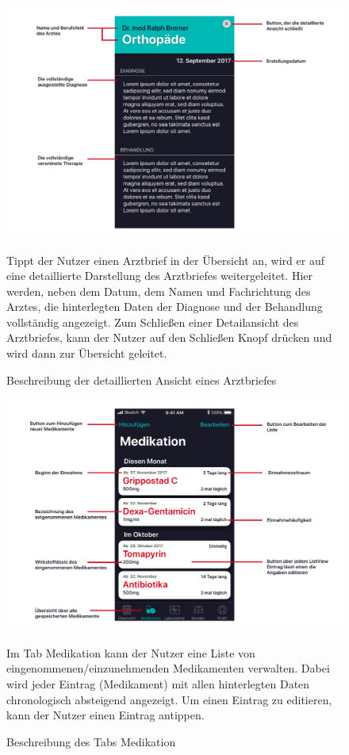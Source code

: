 \documentclass[a4paper]{scrreprt}
\begin{document}
\begin{figure}
\includegraphics[width=1\textwidth]{graphics/UIDescriptions/DetailedDLDesc}
\caption{Beschreibung der detaillierten Ansicht eines Arztbriefes}
\vspace{0.5cm}
Tippt der Nutzer einen Arztbrief in der Übersicht an, wird er auf eine detaillierte Darstellung des Arztbriefes weitergeleitet. Hier werden, neben dem Datum, dem Namen und Fachrichtung des Arztes, die hinterlegten Daten der Diagnose und der Behandlung vollständig angezeigt. Zum Schließen einer Detailansicht des Arztbriefes, kann der Nutzer auf den \dq Schließen\dq{} Knopf drücken und wird dann zur Übersicht geleitet.
\end{figure}

\begin{figure}
\includegraphics[width=1\textwidth]{graphics/UIDescriptions/MedicationsDesc}
\caption{Beschreibung des Tabs \dq Medikation\dq{}}
\vspace{0.5cm}
Im Tab \dq Medikation \dq{} kann der Nutzer eine Liste von eingenommenen/einzunehmenden Medikamenten verwalten. Dabei wird jeder Eintrag (Medikament) mit allen hinterlegten Daten chronologisch absteigend angezeigt. Um einen Eintrag zu editieren, kann der Nutzer einen Eintrag antippen.
\end{figure}
\end{document}
